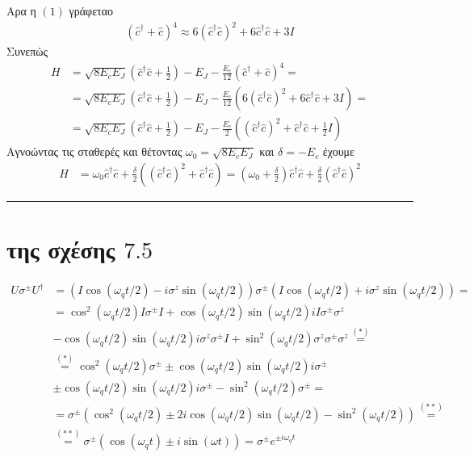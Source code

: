 \documentclass[12pt]{article}
\begin{document}
Αρα η $(1)$ γράφεταο 
\begin{align*}\left(\hat{c}^\dag+\hat{c}\right)^4 \approx  6\left(\hat{c}^\dag\hat{c}\right)^2 +6\hat{c}^\dag\hat{c} +3Ι\end{align*}
Συνεπώς 
\begin{align*}
    H &= \sqrt{8E_cE_J}\left(\hat{c}^\dag \hat{c}+\frac{1}{2}\right) - E_J - \frac{E_c}{12}\left(\hat{c}^\dag+\hat{c}\right)^4  =\\
    &= \sqrt{8E_cE_J}\left(\hat{c}^\dag \hat{c}+\frac{1}{2}\right) - E_J - \frac{E_c}{12}\left(6\left(\hat{c}^\dag\hat{c}\right)^2 +6\hat{c}^\dag\hat{c} +3Ι\right)=\\
    &= \sqrt{8E_cE_J}\left(\hat{c}^\dag \hat{c}+\frac{1}{2}\right) - E_J - \frac{E_c}{2}\left(\left(\hat{c}^\dag\hat{c}\right)^2 +\hat{c}^\dag\hat{c} +\frac{1}{2}Ι\right)
\end{align*}
        Αγνοώντας τις σταθερές και θέτοντας $\omega_0 = \sqrt{8E_cE_J}$ και $\delta = -E_c$ έχουμε
        \begin{align*}
            H&=\omega_0\hat{c}^\dag \hat{c} +\frac{\delta}{2}\left(\left(\hat{c}^\dag\hat{c}\right)^2 +\hat{c}^\dag\hat{c}\right) = \left(\omega_0 +\frac{\delta}{2}\right)\hat{c}^\dag\hat{c} + \frac{\delta}{2}\left(\hat{c}^\dag\hat{c}\right)^2
        \end{align*}
\rule{\textwidth}{.5pt}
\section*{{ της σχέσης $7.5$}}

\begin{align*}
    U\sigma^{\pm}U^\dag &= \left(I\cos(\omega_q t/2) - i\sigma^z\sin(\omega_q t/2)\right)\sigma^\pm\left(I\cos(\omega_q t/2) + i\sigma^z\sin(\omega_q t/2)\right) = \\
    & = \cos^2(\omega_q t/2)I\sigma^\pm I + \cos(\omega_q t/2)\sin(\omega_q t/2)iI\sigma^\pm\sigma^z\\
    & - \cos(\omega_q t/2)\sin(\omega_q t/2)i\sigma^z\sigma^\pm I+\sin^2(\omega_q t/2)\sigma^z\sigma^\pm\sigma^z \stackrel{(*)}{ = }\\
    &\stackrel{(*)}{ = }\cos^2(\omega_q t/2)\sigma^\pm  \pm \cos(\omega_q t/2)\sin(\omega_q t/2)i\sigma^\pm\\
    & \pm \cos(\omega_q t/2)\sin(\omega_q t/2)i\sigma^\pm -\sin^2(\omega_q t/2)\sigma^\pm =\\
    & = \sigma^\pm \left(\cos^2(\omega_q t/2) \pm 2i\cos(\omega_q t/2)\sin(\omega_q t/2)-\sin^2(\omega_q t/2) \right) \stackrel{(**)}{=}\\
    &\stackrel{(**)}{=}\sigma^\pm \left(\cos(\omega_q t)\pm i\sin(\omega t)\right) =\sigma^\pm e^{\pm i\omega_q t}
\end{align*}
\end{document}
